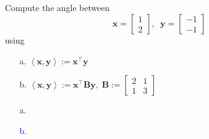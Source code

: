 \documentclass[a4paper,12pt]{article}
\newcommand{\M}[1]{ \begin{bmatrix} #1 \end{bmatrix} }
\newcommand{\vecx}{\textbf{x}}
\newcommand{\vecy}{\textbf{y}}
\newcommand{\matB}{\textbf{B}}
\begin{document}
\subsection{}
Compute the angle between
$$\vecx=\M{1\\2}, \;\; \vecy=\M{-1\\-1}$$
using
\begin{itemize}
 \item [a.] $\left< \vecx, \vecy \right> := \vecx^\top \vecy$
 \item [b.] $\left< \vecx, \vecy \right> := \vecx^\top \matB \vecy, \; \matB := \M{2&1\\1&3}$
\end{itemize}
\textcolor{blue}{
\begin{itemize}
 \item [a.]
 \item [b.]
\end{itemize}
}
\end{document}
